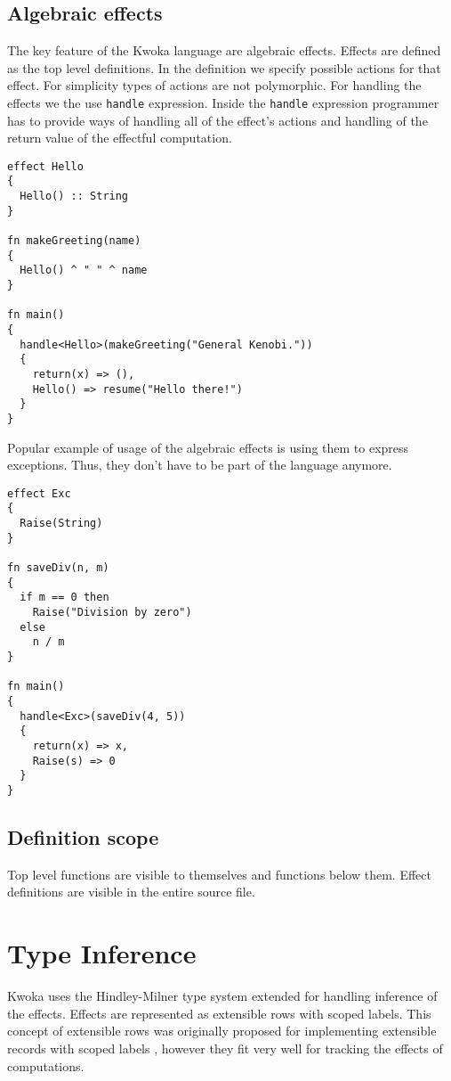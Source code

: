 \documentclass[a4paper]{article}
\begin{document}
\subsection*{Algebraic effects}
The key feature of the Kwoka language are algebraic effects.
Effects are defined as the top level definitions. In the definition we specify possible
actions for that effect. For simplicity types of actions are not polymorphic.
For handling the effects we the use \verb+handle+ expression.
Inside the \verb+handle+ expression programmer has to provide ways of handling all of the
effect's actions and handling of the return value of the effectful computation.
\begin{verbatim}
effect Hello
{
  Hello() :: String
}

fn makeGreeting(name)
{
  Hello() ^ " " ^ name
}

fn main()
{
  handle<Hello>(makeGreeting("General Kenobi."))
  {
    return(x) => (),
    Hello() => resume("Hello there!")
  }
}
\end{verbatim}

Popular example of usage of the algebraic effects is using them to
express exceptions. Thus, they don't have to be part of the language anymore.

\begin{verbatim}
effect Exc
{
  Raise(String)
}

fn saveDiv(n, m)
{
  if m == 0 then
    Raise("Division by zero")
  else
    n / m
}

fn main()
{
  handle<Exc>(saveDiv(4, 5))
  {
    return(x) => x,
    Raise(s) => 0
  }
}
\end{verbatim}

\subsection*{Definition scope}
Top level functions are visible to themselves and functions below them.
Effect definitions are visible in the entire source file.

\section{Type Inference}
Kwoka uses the Hindley-Milner type system \cite{Hindley, Milner} extended for handling
inference of the effects. Effects are represented as extensible rows with
scoped labels. This concept of extensible rows was originally proposed for implementing
extensible records with scoped labels \cite{leijen2005extensible}, however they fit very
well for tracking the effects of computations.
\end{document}
